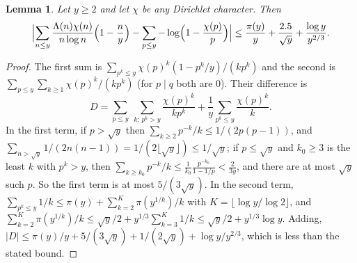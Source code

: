 \documentclass[11pt]{article}
\newtheorem{lemma}[theorem]{Lemma}
\theoremstyle{definition}
\theoremstyle{remark}
\numberwithin{equation}{section}
\begin{document}
\begin{lemma}\label{lem:main}
Let $y\ge2$ and let $\chi$ be any Dirichlet character. Then
\[
 \Bigl|\sum_{n\le y}\frac{\Lambda(n)\chi(n)}{n\log n}\Bigl(1-\frac ny\Bigr)-\sum_{p\le y}-\log\Bigl(1-\frac{\chi(p)}p\Bigr)\Bigr|\le\frac{\pi(y)}y+\frac{2.5}{\sqrt y}+\frac{\log y}{y^{2/3}} .
\]
\end{lemma}
\begin{proof}
The first sum is $\sum_{p^k\le y}\chi(p)^k(1-p^k/y)/(kp^k)$ and the second is $\sum_{p\le y}\sum_{k\ge1}\chi(p)^k/(kp^k)$ (for $p\mid q$ both are $0$). Their difference is
\[
 D=\sum_{p\le y}\ \sum_{k:\,p^k>y}\frac{\chi(p)^k}{kp^k}+\frac1y\sum_{p^k\le y}\frac{\chi(p)^k}{k}.
\]
In the first term, if $p>\sqrt y$ then $\sum_{k\ge2}p^{-k}/k\le1/(2p(p-1))$, and $\sum_{n>\sqrt y}1/(2n(n-1))=1/(2\lfloor\sqrt y\rfloor)\le1/\sqrt y$; if $p\le\sqrt y$ and $k_0\ge3$ is the least $k$ with $p^k>y$, then $\sum_{k\ge k_0}p^{-k}/k\le\frac1{k_0}\frac{p^{-k_0}}{1-1/p}<\frac2{3y}$, and there are at most $\sqrt y$ such $p$. So the first term is at most $5/(3\sqrt y)$. In the second term, $\sum_{p^k\le y}1/k\le\pi(y)+\sum_{k=2}^{K}\pi(y^{1/k})/k$ with $K=\lfloor\log y/\log2\rfloor$, and $\sum_{k=2}^{K}\pi(y^{1/k})/k\le\sqrt y/2+y^{1/3}\sum_{k=3}^{K}1/k\le\sqrt y/2+y^{1/3}\log y$. Adding, $|D|\le\pi(y)/y+5/(3\sqrt y)+1/(2\sqrt y)+\log y/y^{2/3}$, which is less than the stated bound.
\end{proof}
\end{document}
